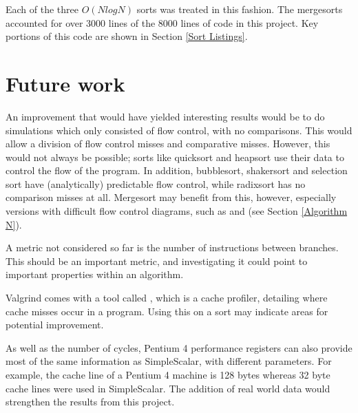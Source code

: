 Each of the three $O(NlogN)$ sorts was treated in this fashion. The mergesorts
accounted for over 3000 lines of the 8000 lines of code in this project. Key
portions of this code are shown in Section \ref{Sort Listings}.

\section{Future work}
An improvement that would have yielded interesting results would be to do simulations
which only consisted of flow control, with no comparisons. This would allow a
division of flow control misses and comparative misses. However, this would not
always be possible; sorts like quicksort and heapsort use their data to
control the flow of the program. In addition, bubblesort, shakersort and
selection sort have (analytically) predictable flow control, while radixsort has
no comparison misses at all. Mergesort may benefit from this, however, especially versions
with difficult flow control diagrams, such as  and  (see Section \ref{Algorithm N}).

A metric not considered so far is the number of instructions between branches.
This should be an important metric, and investigating it could point to
important properties within an algorithm.

Valgrind comes with a tool called , which is a cache
profiler, detailing where cache misses occur in a program. Using this on a
sort may indicate areas for potential improvement.

As well as the number of cycles, Pentium 4 performance registers can also provide
most of the same information as SimpleScalar, with different parameters. For
example, the cache line of a Pentium 4 machine is 128 bytes whereas 32 byte
cache lines were used in SimpleScalar.  The addition of real world data would
strengthen the results from this project.
